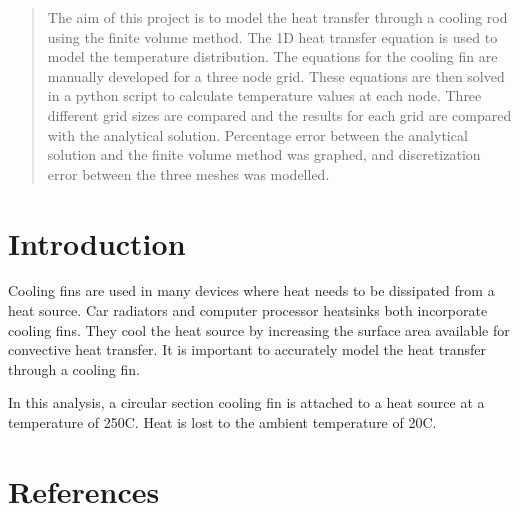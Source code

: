 \documentclass[review]{elsarticle}
\begin{document}
\begin{frontmatter}

\title{}

\author{Peter Armstrong}
\address{University College Cork \\ 115224113}

\begin{abstract}
The aim of this project is to model the heat transfer through a cooling rod using the finite volume method.
The 1D heat transfer equation is used to model the temperature distribution.
The equations for the cooling fin are manually developed for a three node grid. These equations are then solved in a python script to calculate temperature values at each node. Three different grid sizes are compared and the results for each grid are compared with the analytical solution.
Percentage error between the analytical solution and the finite volume method was graphed, and discretization error between the three meshes was modelled.


\end{abstract}









\end{frontmatter}

\linenumbers

\section{Introduction}
Cooling fins are used in many devices where heat needs to be dissipated from a heat source. Car radiators and computer processor heatsinks both incorporate cooling fins. They cool the heat source by increasing the surface area available for convective heat transfer. It is important to accurately model the heat transfer through a cooling fin.


In this analysis, a circular section cooling fin is attached to a heat source at a temperature of 250\degree C. Heat is lost to the ambient temperature of 20\degree C. 

\section*{References}


\end{document}
